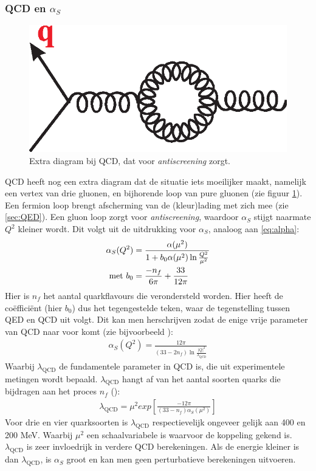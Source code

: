\documentclass[a4paper,11pt]{article}
\numberwithin{equation}{section} %
\begin{document}
    \subsubsection{QCD en $\alpha_S$}
\begin{figure} [H]
  \begin{center}
    \includegraphics[scale=.33]{Afbeeldingen/GluonLoop.eps}
    \caption{Extra diagram bij QCD, dat voor \textit{antiscreening} zorgt. \cite{Martin}}
   \label{fig:GluonLoop}
  \end{center}
\end{figure}
QCD heeft nog een extra diagram dat de situatie iets moeilijker maakt, namelijk een vertex van drie gluonen, en bijhorende loop van pure gluonen (zie figuur \ref{fig:GluonLoop}).
Een fermion loop brengt afscherming van de (kleur)lading met zich mee (zie \ref{sec:QED}).
Een gluon loop zorgt voor \textit{antiscreening}, waardoor  $\alpha_S$ stijgt naarmate $Q^2$ kleiner wordt.
Dit volgt uit de uitdrukking voor $\alpha_S$, analoog aan \eqref{eq:alpha}:
\begin{align}
\alpha_S( Q^2 ) &=\frac{\alpha(\mu^2)}{1+b_0 \alpha(\mu^2) \ln{\frac{Q^2}{\mu^2}}} \\
\text{met } b_0 &= \frac{-n_f}{6\pi} + \frac{33}{12\pi} \notag
\end{align}
Hier is $n_f$ het aantal quarkflavours die verondersteld worden.
Hier heeft de coëfficiënt (hier $b_0$) dus het tegengestelde teken, waar de tegenstelling tussen QED en QCD uit volgt.
Dit kan men herschrijven zodat de enige vrije parameter van QCD naar voor komt (zie bijvoorbeeld \cite[sectie 6.6]{Bettini}):
\begin{align} \label{eq:runningAlphaS}
\alpha_S(Q^2) = \frac{12\pi}{(33-2n_f) \ln{\frac{|Q|^2}{\lambda_\text{QCD}}}}
\end{align}
Waarbij $\lambda_\text{QCD}$ de fundamentele parameter in QCD is, die uit experimentele metingen wordt bepaald.
$\lambda_\text{QCD}$ hangt af van het aantal soorten quarks die bijdragen aan het proces $n_f$ (\cite[sectie 6.6]{Bettini}):
\begin{align}
\lambda_\text{QCD} = \mu^2 exp \left[ \frac{-12\pi}{(33-n_f) \alpha_S(\mu^2)} \right]
\end{align}
Voor drie en vier quarksoorten is $\lambda_\text{QCD}$ respectievelijk ongeveer gelijk aan 400 en 200 MeV.
Waarbij $\mu^2$ een schaalvariabele is waarvoor de koppeling gekend is.
$\lambda_\text{QCD}$ is zeer invloedrijk in verdere QCD berekeningen.
Als de energie kleiner is dan $\lambda_\text{QCD}$, is $\alpha_S$ groot en kan men geen perturbatieve berekeningen uitvoeren.
\end{document}

